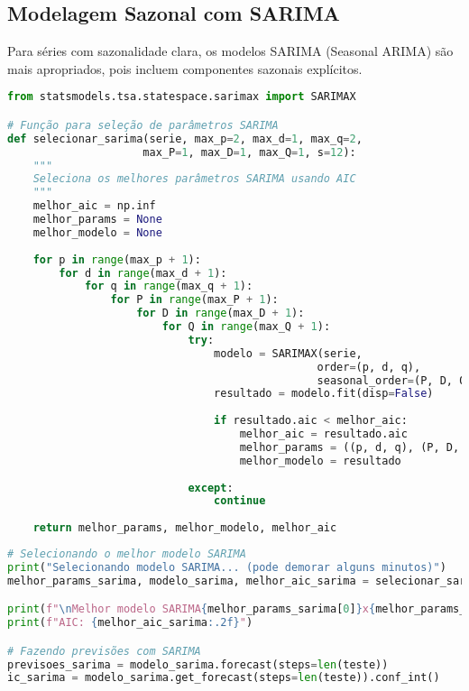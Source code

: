 \subsection{Modelagem Sazonal com SARIMA}

\begin{researchbox}
Para séries com sazonalidade clara, os modelos SARIMA (Seasonal ARIMA) são mais apropriados, pois incluem componentes sazonais explícitos.
\end{researchbox}

\begin{pythonbox}
\begin{lstlisting}[language=Python]
from statsmodels.tsa.statespace.sarimax import SARIMAX

# Função para seleção de parâmetros SARIMA
def selecionar_sarima(serie, max_p=2, max_d=1, max_q=2, 
                     max_P=1, max_D=1, max_Q=1, s=12):
    """
    Seleciona os melhores parâmetros SARIMA usando AIC
    """
    melhor_aic = np.inf
    melhor_params = None
    melhor_modelo = None
    
    for p in range(max_p + 1):
        for d in range(max_d + 1):
            for q in range(max_q + 1):
                for P in range(max_P + 1):
                    for D in range(max_D + 1):
                        for Q in range(max_Q + 1):
                            try:
                                modelo = SARIMAX(serie, 
                                                order=(p, d, q),
                                                seasonal_order=(P, D, Q, s))
                                resultado = modelo.fit(disp=False)
                                
                                if resultado.aic < melhor_aic:
                                    melhor_aic = resultado.aic
                                    melhor_params = ((p, d, q), (P, D, Q, s))
                                    melhor_modelo = resultado
                                    
                            except:
                                continue
    
    return melhor_params, melhor_modelo, melhor_aic
\end{lstlisting}
\end{pythonbox}

\begin{pythonbox}
\begin{lstlisting}[language=Python]
# Selecionando o melhor modelo SARIMA
print("Selecionando modelo SARIMA... (pode demorar alguns minutos)")
melhor_params_sarima, modelo_sarima, melhor_aic_sarima = selecionar_sarima(treino)

print(f"\nMelhor modelo SARIMA{melhor_params_sarima[0]}x{melhor_params_sarima[1]}")
print(f"AIC: {melhor_aic_sarima:.2f}")

# Fazendo previsões com SARIMA
previsoes_sarima = modelo_sarima.forecast(steps=len(teste))
ic_sarima = modelo_sarima.get_forecast(steps=len(teste)).conf_int()
\end{lstlisting}
\end{pythonbox}

